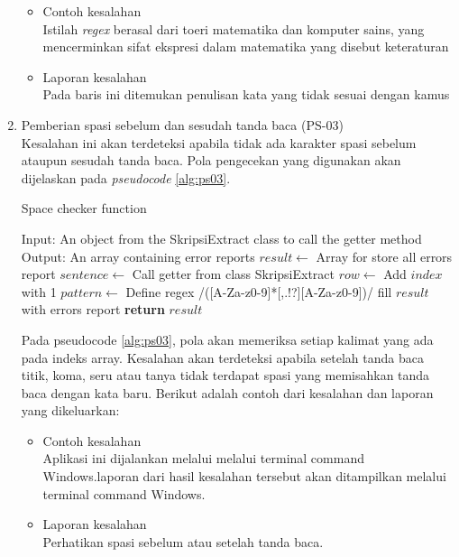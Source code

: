 \begin{enumerate}
	\begin{itemize}
		\item Contoh kesalahan \\
		Istilah \textit{regex} berasal dari toeri matematika dan komputer sains, yang mencerminkan sifat ekspresi dalam matematika yang disebut keteraturan
		\item Laporan kesalahan \\
		Pada baris ini ditemukan penulisan kata yang tidak sesuai dengan kamus
	\end{itemize}
	
	\item Pemberian spasi sebelum dan sesudah tanda baca (PS-03) \\
	Kesalahan ini akan terdeteksi apabila tidak ada karakter spasi sebelum ataupun sesudah tanda baca. Pola pengecekan yang digunakan akan dijelaskan pada \textit{pseudocode} \ref{alg:ps03}.
	
\begin{minipage}{1.0\linewidth}
\begin{algorithm}[H]
    \caption{Space checker function}
	\label{alg:ps03}
	\begin{algorithmic}[1]
    		\State Input: An object from the SkripsiExtract class to call the getter method
			\State Output: An array containing error reports
			\State $result \gets$ Array for store all errors report
			\State $sentence \gets$ Call getter from class SkripsiExtract
    			\State $row \gets$ Add $index$ with 1
				\State $pattern \gets$ Define regex /([A-Za-z0-9]*[,.!?][A-Za-z0-9])/
                	\State fill $result$ with errors report
            	\EndIf
        	\EndFor
    		\State \textbf{return} $result$
    	\EndFunction
	\end{algorithmic}
\end{algorithm}
\end{minipage}
\medskip
	
	Pada pseudocode \ref{alg:ps03}, pola akan memeriksa setiap kalimat yang ada pada indeks array. Kesalahan akan terdeteksi apabila setelah tanda baca titik, koma, seru atau tanya tidak terdapat spasi yang memisahkan tanda baca dengan kata baru. Berikut adalah contoh dari kesalahan dan laporan yang dikeluarkan:
	
	\begin{itemize}
		\item Contoh kesalahan \\
		Aplikasi ini dijalankan melalui melalui terminal command Windows.laporan dari hasil kesalahan tersebut akan ditampilkan melalui terminal command Windows.
		\item Laporan kesalahan \\
		Perhatikan spasi sebelum atau setelah tanda baca.
	\end{itemize}
	

\end{enumerate}
